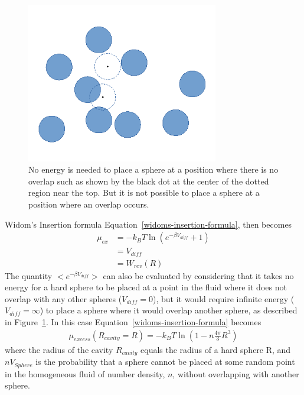 \documentclass[double,12pt]{beavtex}
\begin{document}
\begin{figure}[h!]
    \centering
    \includegraphics[height=7cm]{P_overlap.pdf}
    \caption{No energy is needed to place a sphere at a position where 
    there is no overlap such as shown by the black dot at the center of 
    the dotted region near the top. But it is not possible to place a 
    sphere at a position where an overlap occurs.}
    \label{fig:p_overlap}
  \end{figure}

Widom's Insertion formula Equation~\ref{widoms-insertion-formula}, then becomes
\begin{align}
	\mu_{ex} &= -k_BT\ln\left(e^{-\beta{V_{diff}}}+1\right)  \\
	         &= V_{diff} \\
             &= W_{rev}(R)
\end{align}
The quantity $<e^{-\beta{V_{diff}}}>$ can also be evaluated by considering
that it takes no energy for a hard sphere to be placed at a point
in the fluid where it does not overlap with any other spheres 
($V_{diff}=0$), but it would require infinite energy ($V_{diff}=\infty$)
to place a sphere where it would overlap another sphere, as described 
in Figure~\ref{fig:p_overlap}.
In this case Equation~\ref{widoms-insertion-formula} becomes
\begin{align}
  \mu_{excess}(R_{cavity}=R)=-k_BT\ln(1-n\frac{4\pi}{3}R^3) 
\end{align}
where the radius of the cavity $R_{cavity}$ equals the radius of a hard sphere R,
and $nV_{Sphere}$ is the probability that a sphere cannot be placed at
some random point in the homogeneous fluid of number density, $n$, without
overlapping with another sphere.
\end{document}
